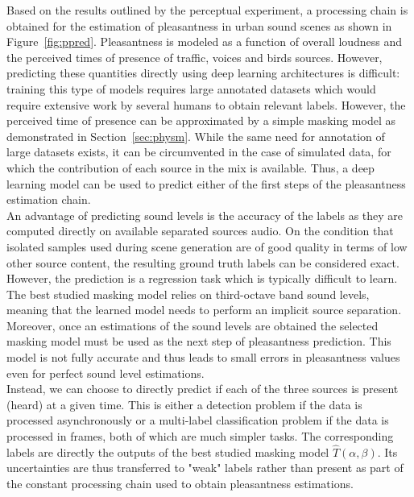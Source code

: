 \documentclass[11pt,a4paper]{article}
\begin{document}
Based on the results outlined by the perceptual experiment, a processing chain is obtained for the estimation of pleasantness in urban sound scenes as shown in Figure~\ref{fig:ppred}. Pleasantness is modeled as a function of overall loudness and the perceived times of presence of traffic, voices and birds sources. However, predicting these quantities directly using deep learning architectures is difficult: training this type of models requires large annotated datasets which would require extensive work by several humans to obtain relevant labels. However, the perceived time of presence can be approximated by a simple masking model as demonstrated in Section~\ref{sec:physm}. While the same need for annotation of large datasets exists, it can be circumvented in the case of simulated data, for which the contribution of each source in the mix is available. Thus, a deep learning model can be used to predict either of the first steps of the pleasantness estimation chain.\\

An advantage of predicting sound levels is the accuracy of the labels as they are computed directly on available separated sources audio. On the condition that isolated samples used during scene generation are of good quality in terms of low other source content, the resulting ground truth labels can be considered exact. However, the prediction is a regression task which is typically difficult to learn. The best studied masking model relies on third-octave band sound levels, meaning that the learned model needs to perform an implicit source separation. Moreover, once an estimations of the sound levels are obtained the selected masking model must be used as the next step of pleasantness prediction. This model is not fully accurate and thus leads to small errors in pleasantness values even for perfect sound level estimations.\\

Instead, we can choose to directly predict if each of the three sources is present (heard) at a given time. This is either a detection problem if the data is processed asynchronously or a multi-label classification problem if the data is processed in frames, both of which are much simpler tasks. The corresponding labels are directly the outputs of the best studied masking model $\hat T(\alpha, \beta)$. Its uncertainties are thus transferred to "weak" labels rather than present as part of the constant processing chain used to obtain pleasantness estimations.\\
\end{document}
